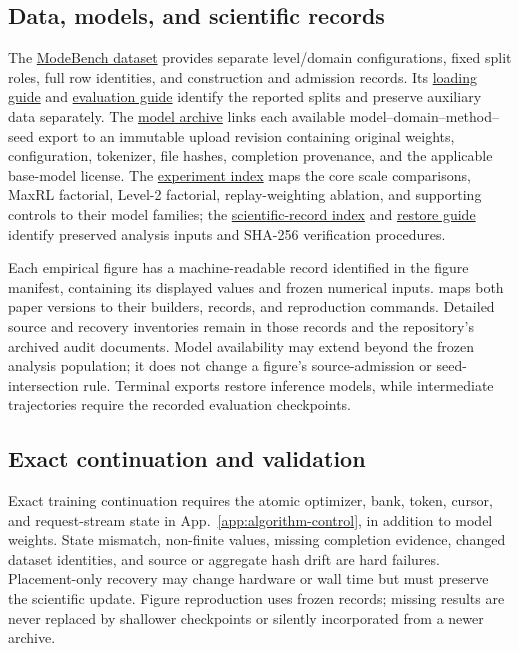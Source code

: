 \documentclass{article}
\newcommand{\1}{\mathbf 1}
\theoremstyle{remark}
\theoremstyle{definition}
\theoremstyle{plain}
\begin{document}
\subsection{Data, models, and scientific records}
\label{app:repro-artifacts}
\label{app:repro-code}
\label{app:archived-models}

The \href{https://huggingface.co/datasets/od2961/ModeBench}{ModeBench dataset}
provides separate level/domain configurations, fixed split roles, full row
identities, and construction and admission records. Its
\href{https://huggingface.co/datasets/od2961/ModeBench\#loading}{loading guide}
and \href{https://huggingface.co/datasets/od2961/ModeBench\#evaluation}{evaluation guide}
identify the reported splits and preserve auxiliary data separately.
The \href{https://huggingface.co/od2961/maxent-grpo-models}{model archive}
links each available model--domain--method--seed export to an immutable
upload revision containing original weights, configuration, tokenizer,
file hashes, completion provenance, and the applicable base-model license.
The \href{https://huggingface.co/od2961/maxent-grpo-models/blob/main/EXPERIMENTS.md}{experiment index}
maps the core scale comparisons, MaxRL factorial, Level-2 factorial,
replay-weighting ablation, and supporting controls to their model families;
the \href{https://huggingface.co/od2961/maxent-grpo-models/blob/main/DATA.md}{scientific-record index}
and \href{https://huggingface.co/od2961/maxent-grpo-models/blob/main/RESTORE.md}{restore guide}
identify preserved analysis inputs and SHA-256 verification procedures.

Each empirical figure has a machine-readable record identified in the
figure manifest, containing its displayed values and frozen numerical inputs.
 maps both paper versions to their builders,
records, and reproduction commands. Detailed source and recovery inventories
remain in those records and the repository's archived audit documents.
Model availability may extend beyond the frozen analysis population; it
does not change a figure's source-admission or seed-intersection rule.
Terminal exports restore inference models, while intermediate trajectories
require the recorded evaluation checkpoints.

\subsection{Exact continuation and validation}
\label{app:repro-recovery}

Exact training continuation requires the atomic optimizer, bank, token,
cursor, and request-stream state in App.~\ref{app:algorithm-control},
in addition to model weights. State mismatch, non-finite values, missing
completion evidence, changed dataset identities, and source or aggregate
hash drift are hard failures. Placement-only recovery may change hardware
or wall time but must preserve the scientific update. Figure reproduction
uses frozen records; missing results are never replaced by shallower
checkpoints or silently incorporated from a newer archive.
\end{document}
